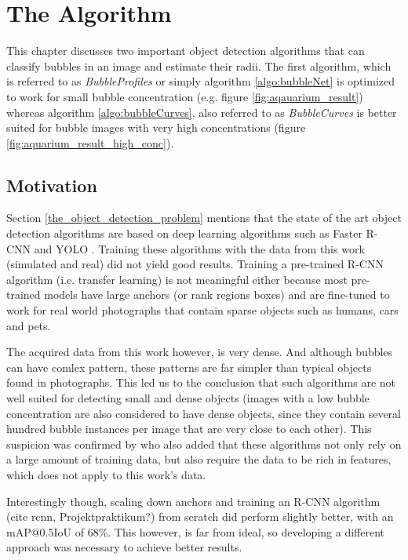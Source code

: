 \chapter{The Algorithm} \label{the_algorithm}
	This chapter discusses two important object detection algorithms that can classify bubbles in an image and estimate their radii. The first algorithm, which is referred to as \textit{BubbleProfiles} or simply algorithm \ref{algo:bubbleNet} is optimized to work for small bubble concentration (e.g. figure \ref{fig:aqauarium_result}) whereas algorithm \ref{algo:bubbleCurves}, also referred to as \textit{BubbleCurves} is better suited for bubble images with very high concentrations (figure \ref{fig:aquarium_result_high_conc}).
		
	\section{Motivation}
		Section \ref{the_object_detection_problem} mentions that the state of the art object detection algorithms are based on deep learning algorithms such as Faster R-CNN \citep{FasterRCNN} and YOLO \citep{YOLO}. Training these algorithms with the data from this work (simulated and real) did not yield good results. Training a pre-trained R-CNN algorithm (i.e. transfer learning) is not meaningful either because most pre-trained models have large anchors (or rank regions boxes) and are fine-tuned to work for real world photographs that contain sparse objects such as humans, cars and pets. 
		
		The acquired data from this work however, is very dense. And although bubbles can have comlex pattern, these patterns are far simpler than typical objects found in photographs. 
		This led us to the conclusion that such algorithms are not well suited for detecting small and dense objects (images with a low bubble concentration are also considered to have dense objects, since they contain several hundred bubble instances per image that are very close to each other). This suspicion was confirmed by \cite{Zhenhua2018} who also added that these algorithms not only rely on a large amount of training data, but also require the data to be rich in features, which does not apply to this work's data. 
		
	Interestingly though, scaling down anchors and training an R-CNN algorithm (cite rcnn, Projektpraktikum?) from scratch did perform slightly better, with an mAP@0.5IoU of 68\%. This however, is far from ideal, so developing a different approach was necessary to achieve better results. 
		
